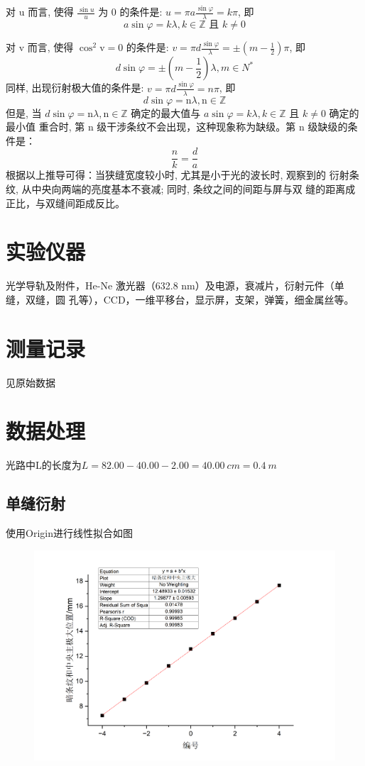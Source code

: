 \documentclass{article}
\begin{document}
对 $\mathrm{u}$ 而言, 使得 $\frac{\sin u}{u}$ 为 0 的条件是: $u=\pi a \frac{\sin \varphi}{\lambda}=k \pi$, 即
$$
a \sin \varphi=k \lambda, k \in \mathbb{Z} \text { 且 } k \neq 0
$$

对 $\mathrm{v}$ 而言, 使得 $\cos ^2 \mathrm{v}=0$ 的条件是: $v=\pi d \frac{\sin \varphi}{\lambda}= \pm\left(m-\frac{1}{2}\right) \pi$, 即
$$
d \sin \varphi= \pm\left(m-\frac{1}{2}\right) \lambda, m \in N^*
$$
同样, 出现衍射极大值的条件是: $v=\pi d \frac{\sin \varphi}{\lambda}=n \pi$, 即
$$
d \sin \varphi=\mathrm{n} \lambda, \mathrm{n} \in \mathbb{Z}
$$
但是, 当 $d \sin \varphi=\mathrm{n} \lambda, \mathrm{n} \in \mathbb{Z}$ 确定的最大值与 $a \sin \varphi=k \lambda, k \in \mathbb{Z}$ 且 $k \neq 0$ 确定的最小值 重合时, 第 $\mathrm{n}$ 级干涉条纹不会出现，这种现象称为缺级。第 $\mathrm{n}$ 级缺级的条件是：
$$
\frac{n}{k}=\frac{d}{a}
$$
根据以上推导可得：当狭缝宽度较小时, 尤其是小于光的波长时, 观察到的 衍射条纹, 从中央向两端的亮度基本不衰减; 同时, 条纹之间的间距与屏与双 缝的距离成正比，与双缝间距成反比。

\section*{实验仪器}
光学导轨及附件，He-Ne 激光器（632.8 nm）及电源，衰减片，衍射元件（单缝，双缝，圆
孔等），CCD，一维平移台，显示屏，支架，弹簧，细金属丝等。 
\section*{测量记录}
见原始数据

\section*{数据处理}
光路中L的长度为\(
    L=82.00-40.00-2.00=\SI{40.00}{cm}=\SI{0.4}{m}\)
\subsection*{单缝衍射}
    使用Origin进行线性拟合如图
    \begin{figure}[htbp]
        \centering
        \includegraphics[scale=0.35]{graph2.png}
    \end{figure}
\end{document}
